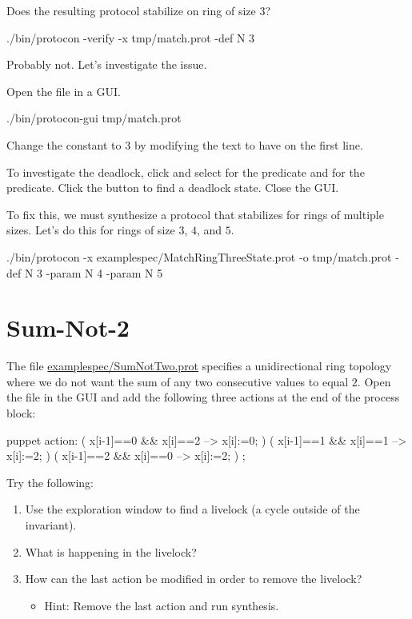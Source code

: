 Does the resulting protocol stabilize on ring of size $3$?
\begin{code}
./bin/protocon -verify -x tmp/match.prot -def N 3
\end{code}
Probably not. Let's investigate the issue.

Open the file in a GUI.
\begin{code}
./bin/protocon-gui tmp/match.prot
\end{code}
Change the constant  to $3$ by modifying the text to have  on the first line.

To investigate the deadlock, click  and select  for the  predicate and  for the  predicate.
Click the  button to find a deadlock state.
Close the GUI.

To fix this, we must synthesize a protocol that stabilizes for rings of multiple sizes.
Let's do this for rings of size $3$, $4$, and $5$.
\begin{code}
./bin/protocon -x examplespec/MatchRingThreeState.prot -o tmp/match.prot -def N 3 -param N 4 -param N 5
\end{code}


\section{Sum-Not-2}

The file \url{examplespec/SumNotTwo.prot} specifies a unidirectional ring topology where we do not want the sum of any two consecutive values to equal $2$.
Open the file in the GUI and add the following three actions at the end of the process block:
\begin{code}
  puppet action:
    ( x[i-1]==0 && x[i]==2 --> x[i]:=0; )
    ( x[i-1]==1 && x[i]==1 --> x[i]:=2; )
    ( x[i-1]==2 && x[i]==0 --> x[i]:=2; )
    ;
\end{code}

Try the following:
\begin{enumerate}
\item Use the exploration window to find a livelock (a cycle outside of the invariant).
\item What is happening in the livelock?
\item How can the last action be modified in order to remove the livelock?
 \begin{itemize}
 \item Hint: Remove the last action and run synthesis.
 \end{itemize}
\end{enumerate}


